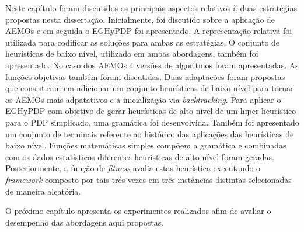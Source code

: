 Neste capítulo foram discutidos os principais aspectos relativos à duas estratégias propostas nesta dissertação. Inicialmente, foi discutido sobre a aplicação de AEMOs e em seguida o EGHyPDP foi apresentado. A representação relativa foi utilizada para codificar as soluções para ambas as estratégias. O conjunto de heurísticas de baixo nível, utilizado em ambas abordagens, também foi apresentado. No caso dos AEMOs 4 versões de algoritmos foram apresentadas. As funções objetivas também foram discutidas. Duas adaptacões foram propostas que consistiram em adicionar um conjunto heurísticas de baixo nível para tornar os AEMOs mais adpatativos e a inicialização via \textit{backtracking}. Para aplicar o EGHyPDP com objetivo de gerar heurísticas de alto nível de um  hiper-heurístico para o PDP simplicado, uma  gramática foi desenvolvida. Também foi apresentado um conjunto de terminais referente ao histórico das aplicações das heurísticas de baixo nível. Funções matemáticas simples compõem a gramática e combinadas com os dados estatísticos diferentes heurísticas de alto nível foram geradas. Posteriormente, a função de \textit{fitness} avalia estas heurística executando o \textit{framework} composto por tais trés vezes em três instâncias distintas selecionadas de maneira aleatória.
 
 O próximo capítulo apresenta os experimentos realizados afim de avaliar o desempenho das abordagens aqui propostas.



